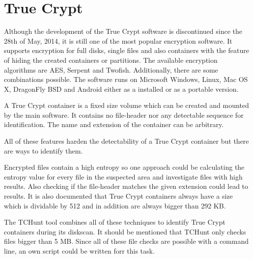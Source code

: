 \section{True Crypt}
Although the development of the True Crypt software is discontinued since the 28th of May, 2014, it is still one of the most popular encryption software.
It supports encryption for full disks, single files and also containers with the feature of hiding the created containers or partitions.
The available encryption algorithms are AES, Serpent and Twofish. Additionally, there are some combinations possible.
The software runs on Microsoft Windows, Linux, Mac OS X, DragonFly BSD and Android either as a installed or as a portable version.\cite{wiki:truecrypt}

A True Crypt container is a fixed size volume which can be created and mounted by the main software.
It contains no file-header nor any detectable sequence for identification.
The name and extension of the container can be arbitrary.

All of these features harden the detectability of a True Crypt container but there are ways to identify them.

Encrypted files contain a high entropy so one approach could be calculating the entropy value for every file in the suspected area and investigate files with high results.
Also checking if the file-header matches the given extension could lead to results.
It is also documented that True Crypt containers always have a size which is dividable by 512 and in addition are always bigger than 292 KB.\cite{truecrypt:sourceCode}

The TCHunt tool combines all of these techniques to identify True Crypt containers during its diskscan. It should be mentioned that TCHunt only checks files bigger than 5 MB.
Since all of these file checks are possible with a command line, an own script could be written forr this task.

